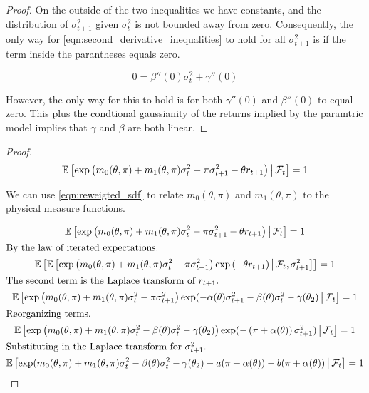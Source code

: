 \documentclass[11pt, letterpaper, twoside, final]{article}
\begin{document}
\begin{appendices}
\begin{proof}
    On the outside of the two inequalities we have constants, and the distribution of $\sigma^2_{t+1}$ given
    $\sigma^2_t$ is not bounded away from zero.
    Consequently, the only way for \cref{eqn:second_derivative_inequalities} to hold for all $\sigma^2_{t+1}$ is
    if the term inside the parantheses equals  zero.

    \begin{equation}
        0 = \beta''(0) \sigma^2_t + \gamma''(0)
    \end{equation}

    However, the only way for this to hold is for both $\gamma''(0)$ and $\beta''(0)$ to equal zero.
    This plus the condtional gaussianity of the returns implied by the paramtric model implies that $\gamma$
    and $\beta$  are both linear.

\end{proof}


\sdfConstants*

\begin{proof}

\begin{equation}
    \label{eqn:reweigted_sdf}
    \operatorname{\mathbb{E}}\left[\exp\left(m_0(\theta, \pi) + m_1(\theta, \pi) \sigma^2_t - \pi \sigma^2_{t+1} - \theta r_{t+1}
    \right) \,\middle\vert\, \mathcal{F}_t \right] = 1 
\end{equation}

We can use \cref{eqn:reweigted_sdf} to relate $m_0(\theta, \pi)$ and $m_1(\theta, \pi)$ to the physical measure
functions. 

\begin{gather}
    \operatorname{\mathbb{E}}\left[\exp\left(m_0(\theta, \pi) + m_1(\theta, \pi) \sigma^2_t - \pi \sigma^2_{t+1} - \theta r_{t+1}
    \right) \,\middle\vert\, \mathcal{F}_t \right] = 1 \\
    \intertext{By the law of iterated expectations.}
    \operatorname{\mathbb{E}}\left[ \operatorname{\mathbb{E}}\left[\exp\left(m_0(\theta, \pi) + m_1(\theta, \pi) \sigma^2_t - \pi \sigma^2_{t+1}\right)
        \exp\left( - \theta r_{t+1}\right) \,\middle\vert\, \mathcal{F}_t, \sigma^2_{t+1} \right]\right] = 1 \\
    \intertext{The second term is the Laplace transform of $r_{t+1}$.}
    \operatorname{\mathbb{E}}\left[\exp\left(m_0(\theta, \pi) + m_1(\theta, \pi) \sigma^2_t - \pi \sigma^2_{t+1} \right)
        \exp(-\alpha(\theta) \sigma^2_{t+1} - \beta(\theta) \sigma^2_{t} - \gamma(\theta_2)
        \,\middle\vert\, \mathcal{F}_t \right] = 1 \\
    \intertext{Reorganizing terms.}
    \operatorname{\mathbb{E}}\left[\exp\left(m_0(\theta, \pi) + m_1(\theta, \pi) \sigma^2_t - \beta(\theta) \sigma^2_{t} -
        \gamma(\theta_2) \right) \exp(-\left(\pi + \alpha(\theta)\right) \sigma^2_{t+1}) \,\middle\vert\, \mathcal{F}_t
        \right] = 1 \\ 
    \intertext{Substituting in the Laplace transform for $\sigma^2_{t+1}$.} 
    \label{eqn:expected_sdf_wrt_PP}
    \operatorname{\mathbb{E}}\left[\exp(m_0(\theta, \pi) + m_1(\theta, \pi) \sigma^2_t - \beta(\theta) \sigma^2_{t} -
        \gamma(\theta_2)  - a(\pi + \alpha(\theta)) - b(\pi + \alpha(\theta))
        \,\middle\vert\, \mathcal{F}_t \right] = 1 
\end{gather}


\end{proof}
\end{appendices}
\end{document}
